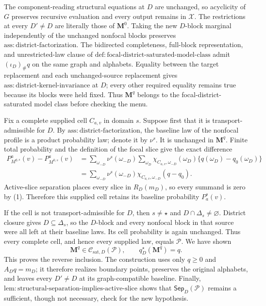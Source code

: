 The component-reading structural equations at \(D\) are unchanged, so acyclicity of \(G\) preserves recursive evaluation and every output remains in \(\mathcal X\).  The restrictions at every \(D'\ne D\) are literally those of \(\mathbf M^0\).  Taking the new \(D\)-block marginal independently of the unchanged nonfocal blocks preserves \(\mathrm{ass:district\text{-}factorization}\).  The bidirected completeness, full-block representation, and unrestricted-law clause of \(\mathrm{def:focal\text{-}district\text{-}saturated\text{-}model\text{-}class}\) admit \((\iota_D)_\#q\) on the same graph and alphabets.  Equality between the target replacement and each unchanged-source replacement gives \(\mathrm{ass:district\text{-}kernel\text{-}invariance}\) at \(D\); every other required equality remains true because its blocks were held fixed.  Thus \(\mathbf M^q\) belongs to the focal-district-saturated model class before checking the menu.

Fix a complete supplied cell \(C_{a,v}\) in domain \(s\).  Suppose first that it is transport-admissible for \(D\).  By \(\mathrm{ass:district\text{-}factorization}\), the baseline law of the nonfocal profile is a product probability law; denote it by \(\nu^s\).  It is unchanged in \(\mathbf M^q\).  Finite total probability and the definition of the focal slice give the exact difference
\[
\begin{aligned}
P_{M^{q,s}}^a(v)-P_{M^{0,s}}^a(v)
&=\sum_{\omega_{-D}}
\nu^s(\omega_{-D})
\sum_{\omega_D}
\chi_{C_{a,v},\omega_{-D}}(\omega_D)
\{q(\omega_D)-q_0(\omega_D)\}\\
&=\sum_{\omega_{-D}}
\nu^s(\omega_{-D})
\chi_{C_{a,v},\omega_{-D}}(q-q_0).
\end{aligned}
\]
Active-slice separation places every slice in \(R_D(m_D)\), so every summand is zero by (1).  Therefore this supplied cell retains its baseline probability \(P_a^s(v)\).

If the cell is not transport-admissible for \(D\), then \(s\ne\star\) and \(D\cap\Delta_s\ne\varnothing\).  District closure gives \(D\subseteq\Delta_s\), so the \(D\)-block and every nonfocal block in that source were all left at their baseline laws.  Its cell probability is again unchanged.  Thus every complete cell, and hence every supplied law, equals \(\mathcal P\).  We have shown
\[
\mathbf M^q\in\mathcal C_{\mathrm{sat},D}(\mathcal P),
\qquad q_D^\star(\mathbf M^q)=q.
\]
This proves the reverse inclusion.  The construction uses only \(q\geq0\) and \(A_Dq=m_D\); it therefore realizes boundary points, preserves the original alphabets, and leaves every \(D'\ne D\) at its graph-compatible baseline.  Finally, \(\mathrm{lem:structural\text{-}separation\text{-}implies\text{-}active\text{-}slice}\) shows that \(\mathsf{Sep}_D(\mathcal P)\) remains a sufficient, though not necessary, check for the new hypothesis.